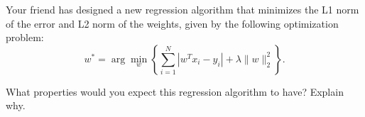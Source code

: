 Your friend has designed a new regression algorithm that minimizes the L1 norm of the error and L2 norm of the weights, given by the following optimization problem:
\[
w^*=\arg\min_w\left\{\sum_{i=1}^N|w^Tx_i-y_i|+\lambda\|w\|_2^2\right\}.
\]


What properties would you expect this regression algorithm to have? Explain why.
